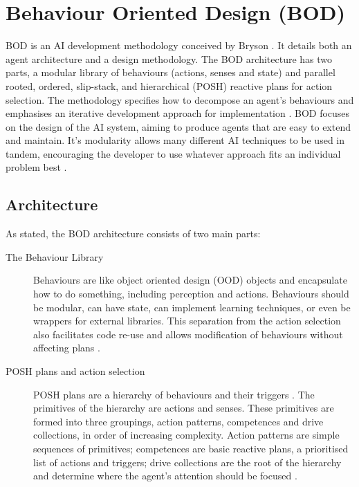 \documentclass[11pt,openright,a4paper]{report}
\begin{document}
\section{Behaviour Oriented Design (BOD)}
BOD is an AI development methodology conceived by Bryson \cite{bryson2001intelligence}. It details both an agent architecture and a design methodology.  The BOD architecture has two parts, a modular library of behaviours (actions, senses and state) and parallel rooted, ordered, slip-stack,  and hierarchical (POSH) reactive plans for action selection. The methodology specifies how to decompose an agent's behaviours and emphasises an iterative development approach for implementation \cite{bryson2003behavior}. BOD focuses on the design of the AI system, aiming to produce agents that are easy to extend and maintain. It's modularity allows many different AI techniques to be used in tandem, encouraging the developer to use whatever approach fits an individual problem best \cite{gaudlbehaviour}.

\subsection{Architecture}
As stated,  the BOD architecture consists of two main parts:
\begin{description}
\item[The Behaviour Library] Behaviours are like object oriented design (OOD) objects and encapsulate how to do something, including perception and actions. Behaviours should be modular, can have state, can implement learning techniques, or even be wrappers for external libraries. This separation from the action selection also facilitates code re-use and allows modification of behaviours without affecting plans \cite{gaudlbehaviour}.
\item[POSH plans and action selection] \label{POSHPlans}POSH plans are a hierarchy of behaviours and their triggers \cite{gaudlbehaviour}. The primitives of the hierarchy are actions and senses. These primitives are formed into three groupings, action patterns, competences and drive collections, in order of increasing complexity. Action patterns are simple sequences of primitives; competences are basic reactive plans, a prioritised list of actions and triggers; drive collections are the root of the hierarchy and determine where the agent's attention should be focused \cite{bryson2003behavior}.
\end{description}
\end{document}
